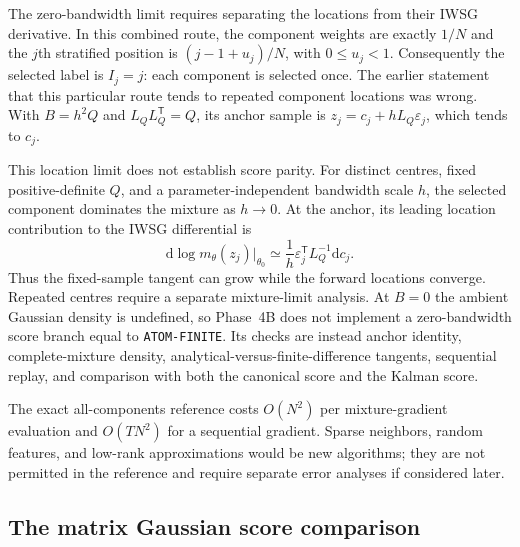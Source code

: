 \documentclass[11pt]{article}
\newcommand{\dd}{\mathrm{d}}
\begin{document}
The zero-bandwidth limit requires separating the locations from their IWSG
derivative.  In this combined route, the component weights are exactly $1/N$
and the $j$th stratified position is $(j-1+u_j)/N$, with $0\le u_j<1$.
Consequently the selected label is $I_j=j$: each component is selected once.
The earlier statement that this particular route tends to repeated component
locations was wrong.  With $B=h^2Q$ and $L_QL_Q^\mathsf{T}=Q$, its anchor
sample is $z_j=c_j+hL_Q\varepsilon_j$, which tends to $c_j$.

This location limit does not establish score parity.  For distinct centres,
fixed positive-definite $Q$, and a parameter-independent bandwidth scale $h$,
the selected component dominates the mixture as $h\to0$.  At the anchor,
its leading location contribution to the IWSG differential is
\begin{equation}
 \dd\log m_\theta(z_j)\big|_{\theta_0}
 \simeq \frac{1}{h}\varepsilon_j^\mathsf{T}L_Q^{-1}\dd c_j.
 \label{eq:phase4b-small-bandwidth-tangent}
\end{equation}
Thus the fixed-sample tangent can grow while the forward locations converge.
Repeated centres require a separate mixture-limit analysis.  At $B=0$ the
ambient Gaussian density is undefined, so Phase~4B does not implement a
zero-bandwidth score branch equal to \texttt{ATOM-FINITE}.  Its checks are instead anchor
identity, complete-mixture density, analytical-versus-finite-difference
tangents, sequential replay, and comparison with both the canonical score and
the Kalman score.

The exact all-components reference costs $O(N^2)$ per mixture-gradient
evaluation and $O(TN^2)$ for a sequential gradient.  Sparse neighbors, random
features, and low-rank approximations would be new algorithms; they are not
permitted in the reference and require separate error analyses if considered
later.

\subsection{The matrix Gaussian score comparison}
\end{document}
